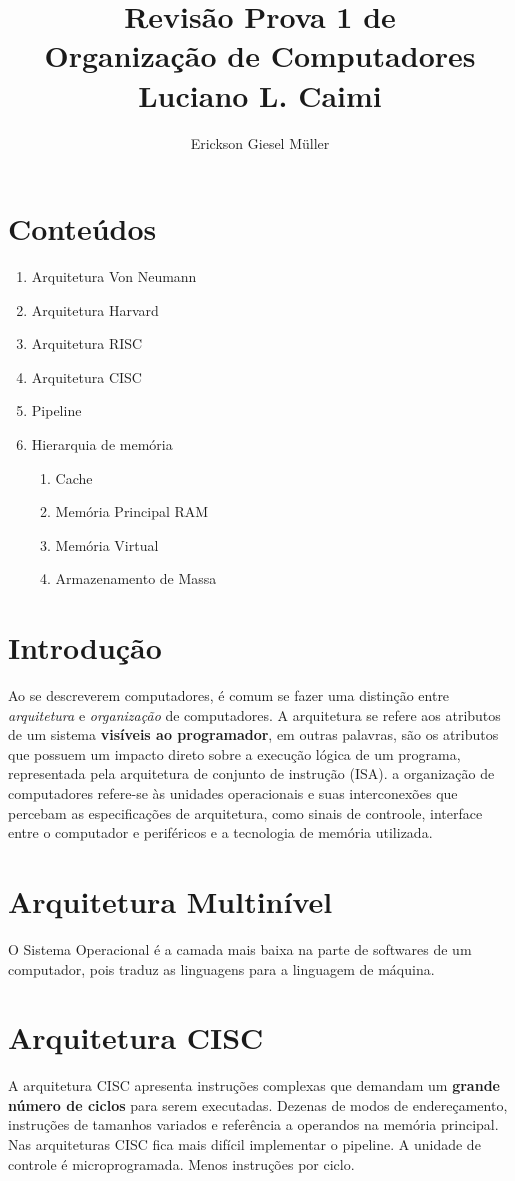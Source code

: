 \documentclass{article}
\title{Revisão Prova 1 de\\Organização de Computadores\\Luciano L. Caimi}
\author{Erickson Giesel Müller}
\date{}
\begin{document}
	\maketitle
	\section*{Conteúdos}
		\begin{enumerate}
			\item Arquitetura Von Neumann
			\item Arquitetura Harvard
			\item Arquitetura RISC
			\item Arquitetura CISC
			
			\item Pipeline
			\item Hierarquia de memória
				\begin{enumerate}
				 	\item Cache
				 	\item Memória Principal RAM
				 	\item Memória Virtual
				 	\item Armazenamento de Massa
				\end{enumerate}
		\end{enumerate}
	\section{Introdução}
		Ao se descreverem computadores, é comum se fazer uma distinção entre \textit{arquitetura} e \textit{organização} de computadores. A arquitetura se refere aos atributos de um sistema \textbf{visíveis ao programador}, em outras palavras, são os atributos que possuem um impacto direto sobre a execução lógica de um programa, representada pela arquitetura de conjunto de instrução (ISA). a organização de computadores refere-se às unidades operacionais e suas interconexões que percebam as especificações de arquitetura, como sinais de controole, interface entre o computador e periféricos e a tecnologia de memória utilizada.
	\section{Arquitetura Multinível}
		O Sistema Operacional é a camada mais baixa na parte de softwares de um computador, pois traduz as linguagens para a linguagem de máquina.
		
	\section{Arquitetura CISC}
		A arquitetura CISC apresenta instruções complexas que demandam um \textbf	{grande número de ciclos} para serem executadas. Dezenas de modos de endereçamento, instruções de tamanhos variados e referência a operandos na memória principal.\\
		Nas arquiteturas CISC fica mais difícil implementar o pipeline. A unidade de controle é microprogramada. Menos instruções por ciclo.
		
\end{document}
